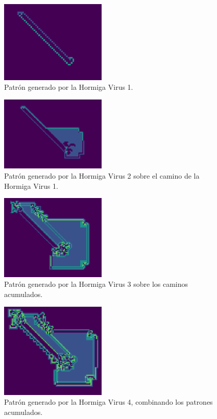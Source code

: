 \documentclass[11pt,letterpaper]{article}
\begin{document}
\begin{multicols}{2}
\begin{figure}[h!]
    \centering
    \includegraphics[width=0.45\textwidth]{virus1.png}
    \caption{Patrón generado por la Hormiga Virus 1.}
    \label{fig:virus1}
\end{figure}

\begin{figure}[h!]
    \centering
    \includegraphics[width=0.45\textwidth]{virus2.png}
    \caption{Patrón generado por la Hormiga Virus 2 sobre el camino de la Hormiga Virus 1.}
    \label{fig:virus2}
\end{figure}

\begin{figure}[h!]
    \centering
    \includegraphics[width=0.45\textwidth]{virus3.png}
    \caption{Patrón generado por la Hormiga Virus 3 sobre los caminos acumulados.}
    \label{fig:virus3}
\end{figure}

\begin{figure}[h!]
    \centering
    \includegraphics[width=0.45\textwidth]{virus4.png}
    \caption{Patrón generado por la Hormiga Virus 4, combinando los patrones acumulados.}
    \label{fig:virus4}
\end{figure}


\end{multicols}
\end{document}
